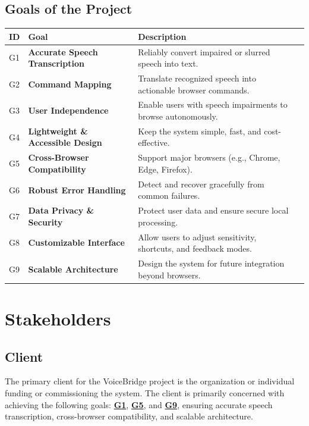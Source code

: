 \documentclass[11pt]{article}
\begin{document}
\subsection{Goals of the Project}
\begin{table}[H]
\centering
\begin{tabularx}{\textwidth}{p{1cm}p{4cm}p{8cm}X}
\toprule {\textbf{ID}} & {\textbf{Goal}} & {\textbf{Description}}\\
\midrule
G1 & \textbf{Accurate Speech Transcription} & Reliably convert impaired or slurred speech into text. \\ \hline
G2 & \textbf{Command Mapping} & Translate recognized speech into actionable browser commands. \\ \hline
G3 & \textbf{User Independence} & Enable users with speech impairments to browse autonomously. \\ \hline
G4 & \textbf{Lightweight \& Accessible Design} & Keep the system simple, fast, and cost-effective. \\ \hline
G5 & \textbf{Cross-Browser Compatibility} & Support major browsers (e.g., Chrome, Edge, Firefox). \\ \hline
G6 & \textbf{Robust Error Handling} & Detect and recover gracefully from common failures. \\ \hline
G7 & \textbf{Data Privacy \& Security} & Protect user data and ensure secure local processing. \\ \hline
G8 & \textbf{Customizable Interface} & Allow users to adjust sensitivity, shortcuts, and feedback modes. \\ \hline
G9 & \textbf{Scalable Architecture} & Design the system for future integration beyond browsers. \\ 
\bottomrule
\end{tabularx}
\label{tab:project-goals}
\end{table}


\section{Stakeholders}
\subsection{Client}
The primary client for the VoiceBridge project is the organization or individual funding or commissioning the system. The client is primarily concerned with achieving the following goals: \textbf{\hyperref[tab:project-goals]{G1}}, \textbf{\hyperref[tab:project-goals]{G5}}, and \textbf{\hyperref[tab:project-goals]{G9}}, ensuring accurate speech transcription, cross-browser compatibility, and scalable architecture.
\end{document}
